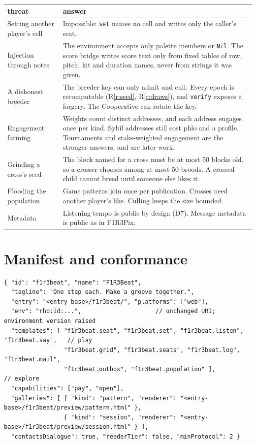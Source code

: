 \documentclass[11pt,a4paper]{article}
\newcommand{\code}[1]{\texttt{#1}}
\begin{document}
\begin{center}\small
\begin{tabularx}{\linewidth}{@{}>{\raggedright\arraybackslash}p{40mm} X@{}}
\toprule
threat & answer\\
\midrule
Setting another player's cell & Impossible: \code{set} names no cell and writes only the caller's seat.\\
Injection through notes & The environment accepts only palette members or \code{Nil}. The score bridge writes score text only from fixed tables of row, pitch, kit and duration names, never from strings it was given.\\
A dishonest breeder & The breeder key can only admit and cull. Every epoch is recomputable (R\ref{r:seed}, R\ref{r:draws}), and \code{verify} exposes a forgery. The Cooperative can rotate the key.\\
Engagement farming & Weights count distinct addresses, and each address engages once per kind. Sybil addresses still cost phlo and a profile. Tournaments and stake-weighted engagement are the stronger answers, and are later work.\\
Grinding a cross's seed & The block named for a cross must be at most 50 blocks old, so a crosser chooses among at most 50 broods. A crossed child cannot breed until someone else likes it.\\
Flooding the population & Game patterns join once per publication. Crosses need another player's like. Culling keeps the size bounded.\\
Metadata & Listening tempo is public by design (D7). Message metadata is public as in F1R3Pix.\\
\bottomrule
\end{tabularx}
\end{center}

\section{Manifest and conformance}\label{sec:manifest}

\begin{lstlisting}
{ "id": "f1r3beat", "name": "F1R3Beat",
  "tagline": "One step each. Make a groove together.",
  "entry": "<entry-base>/f1r3beat/", "platforms": ["web"],
  "env": "rho:id:...",                     // unchanged URI; environment version raised
  "templates": [ "f1r3beat.seat", "f1r3beat.set", "f1r3beat.listen", "f1r3beat.say",   // play
                 "f1r3beat.grid", "f1r3beat.seats", "f1r3beat.log", "f1r3beat.mail",
                 "f1r3beat.outbox", "f1r3beat.population" ],                         // explore
  "capabilities": ["pay", "open"],
  "galleries": [ { "kind": "pattern", "renderer": "<entry-base>/f1r3beat/preview/pattern.html" },
                 { "kind": "session", "renderer": "<entry-base>/f1r3beat/preview/session.html" } ],
  "contactsDialogue": true, "readerTier": false, "minProtocol": 2 }
\end{lstlisting}
\end{document}

